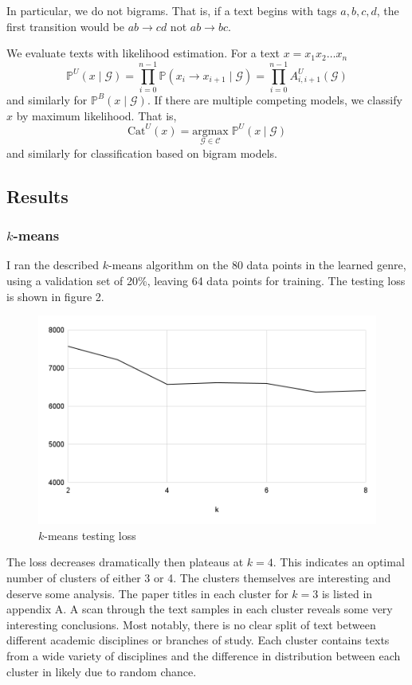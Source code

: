 \documentclass[12pt, titlepage]{article}
\begin{document}
In particular, we do not  bigrams. That is, if a text begins with tags $a,b,c,d$, the first transition would be $ab \to cd$ not $ab \to bc$.

We evaluate texts with likelihood estimation. For a text $x = x_1 x_2 \dots x_n$
\begin{equation}
\mathbb{P}^U(x \;|\; \mathcal{G}) = \prod_{i = 0}^{n - 1} \mathbb{P}(x_i \to x_{i+1} \; |\; \mathcal{G}) = \prod_{i = 0}^{n - 1} A^U_{i,i+1}(\mathcal{G})
\end{equation}
and similarly for $\mathbb{P}^B(x \;|\; \mathcal{G})$. If there are multiple competing models, we classify $x$ by maximum likelihood. That is,
\begin{equation}
\mathrm{Cat}^U(x) = \underset{\mathcal{G} \in \mathcal{C}}{\mathrm{argmax}} \; \mathbb{P}^U(x \:|\; \mathcal{G})
\end{equation}
and similarly for classification based on bigram models.

\subsection{Results}
\subsubsection{$k$-means}
I ran the described $k$-means algorithm on the 80 data points in the learned genre, using a validation set of 20\%, leaving 64 data points for training. The testing loss is shown in figure 2.

\begin{figure}
\centering
\includegraphics[width=0.7\linewidth]{img/chart.png}
\caption{$k$-means testing loss}
\end{figure}

The loss decreases dramatically then plateaus at $k = 4$. This indicates an optimal number of clusters of either 3 or 4. The clusters themselves are interesting and deserve some analysis. The paper titles in each cluster for $k = 3$ is listed in appendix A. A scan through the text samples in each cluster reveals some very interesting conclusions. Most notably, there is no clear split of text between different academic disciplines or branches of study. Each cluster contains texts from a wide variety of disciplines and the difference in distribution between each cluster in likely due to random chance.
\end{document}
